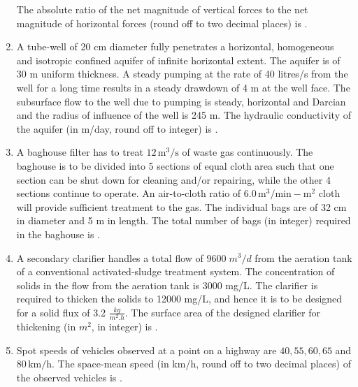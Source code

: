 \documentclass[journal]{IEEEtran}
\numberwithin{equation}{enumi}
\numberwithin{figure}{enumi}
\begin{document}
\begin{enumerate}
The absolute ratio of the net magnitude of vertical forces to the net magnitude of horizontal forces (round off to two decimal places) is \underline{\hspace{2cm}}.
\begin{figure}[H]
			\centering
			
			\caption{}
			\label{fig:5}
	\end{figure}
\bigskip

\item 
A tube-well of 20 cm diameter fully penetrates a horizontal, homogeneous and isotropic confined aquifer of infinite horizontal extent. The aquifer is of 30 m uniform thickness. A steady pumping at the rate of 40 litres/s from the well for a long time results in a steady drawdown of 4 m at the well face. The subsurface flow to the well due to pumping is steady, horizontal and Darcian and the radius of influence of the well is 245 m. The hydraulic conductivity of the aquifer (in m/day, round off to integer) is \underline{\hspace{2cm}}.

\bigskip

\item 
A baghouse filter has to treat $12 \, \text{m}^3/\text{s}$ of waste gas continuously. The baghouse is to be divided into 5 sections of equal cloth area such that one section can be shut down for cleaning and/or repairing, while the other 4 sections continue to operate. An air-to-cloth ratio of $6.0 \, \text{m}^3/\text{min}-\text{m}^2$ cloth will provide sufficient treatment to the gas. The individual bags are of 32 cm in diameter and 5 m in length. The total number of bags (in integer) required in the baghouse is \underline{\hspace{2cm}}.

\item 
A secondary clarifier handles a total flow of $9600\;m^3/d$ from the aeration tank of a conventional activated-sludge treatment system. The concentration of solids in the flow from the aeration tank is 3000 mg/L. The clarifier is required to thicken the solids to 12000 mg/L, and hence it is to be designed for a solid flux of 3.2 $\frac{kg}{m^2.h}$. The surface area of the designed clarifier for thickening (in $m^2$, in integer) is  \underline{\hspace{2cm}}.

\bigskip

\item 
Spot speeds of vehicles observed at a point on a highway are $40, 55, 60, 65$ and $80 \, \text{km/h}$. The space-mean speed (in km/h, round off to two decimal places) of the observed vehicles is \underline{\hspace{2cm}}.


\end{enumerate}
\end{document}
